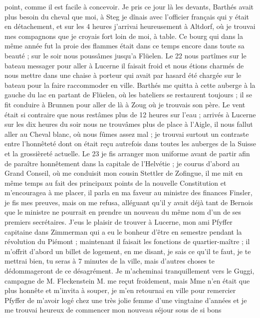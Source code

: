 \documentclass[12pt]{article}
\begin{document}
 point, comme il est facile à concevoir. Je pris
ce jour là les devants, Barthés avait plus besoin du cheval que moi, à Steg je dînais avec
l’officier français qui y était en détachement, et sur les 4 heures j’arrivai heureusement à
Altdorf, où je trouvai mes compagnons que je croyais fort loin de moi, à table. Ce bourg qui dans la
même année fut la proie des flammes était dans ce temps encore dans toute sa beauté ; sur le soir
nous poussâmes jusqu’a Flüelen. Le 22 nous partîmes sur le bateau messager pour aller à Lucerne il
faisait froid et nous étions charmés de nous mettre dans une chaise à porteur qui avait par hasard
été chargée sur le bateau pour la faire raccommoder en ville. Barthés me quitta à cette auberge à la
gauche du lac en partant de Flüelen, où les bateliers se restaurent toujours ; il se fit conduire à
Brunnen pour aller de là à Zoug où je trouvais son père. Le vent était si contraire que nous
restâmes plus de 12 heures sur l’eau ; arrivés à Lucerne sur les dix heures du soir nous ne
trouvâmes plus de place à l’Aigle, il nous fallut aller au Cheval blanc, où nous fûmes assez mal ;
je trouvai surtout un contraste entre l’honnêteté dont on était reçu autrefois dans toutes les
auberges de la Suisse et la grossièreté actuelle. Le 23 je fis arranger mon uniforme avant de partir
afin de paraître honnêtement dans la capitale de l’Helvétie ; je courus d’abord au Grand Conseil, où
me conduisit mon cousin Stettler de Zofingue, il me mit en même temps au fait des principaux points
de la nouvelle Constitution et m’encouragea à me placer, il parla en ma faveur au ministre des
finances Finsler, je fis mes preuves, mais on me refusa, alléguant qu’il y avait déjà tant de
Bernois que le ministre ne pourrait en prendre un nouveau du même nom d’un de ses premiers
secrétaires. J’eus le plaisir de trouver à Lucerne, mon ami Pfyffer capitaine dans Zimmerman qui a
eu le bonheur d’être en semestre pendant la révolution du Piémont ; maintenant il faisait les
fonctions de quartier-maître ; il m’offrit d’abord un billet de logement, en me disant, je sais ce
qu’il te faut, je te mettrai bien, tu seras à 7 minutes de la ville, mais d’autres choses te
dédommageront de ce désagrément. Je m’acheminai tranquillement vers le Guggi, campagne de M.
Fleckenstein M. me reçut froidement, mais Mme n’en était que plus honnête et m’invita à souper, je
m’en retournai en ville pour remercier Pfyffer de m’avoir logé chez une très jolie femme d’une
vingtaine d’années et je me trouvai heureux de commencer mon nouveau séjour sous de si bons
\end{document}
